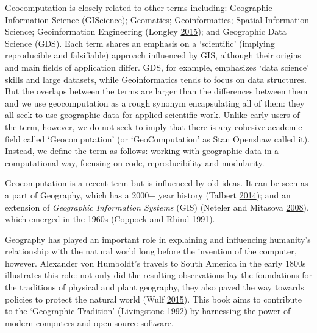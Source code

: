 \documentclass[]{krantz}
\begin{document}
Geocomputation is closely related to other terms including: Geographic Information Science (GIScience); Geomatics; Geoinformatics; Spatial Information Science; Geoinformation Engineering (Longley \protect\hyperlink{ref-longley_geographic_2015}{2015}); and Geographic Data Science (GDS).
Each term shares an emphasis on a `scientific' (implying reproducible and falsifiable) approach influenced by GIS, although their origins and main fields of application differ.
GDS, for example, emphasizes `data science' skills and large datasets, while Geoinformatics tends to focus on data structures.
But the overlaps between the terms are larger than the differences between them and we use geocomputation as a rough synonym encapsulating all of them:
they all seek to use geographic data for applied scientific work.
Unlike early users of the term, however, we do not seek to imply that there is any cohesive academic field called `Geocomputation' (or `GeoComputation' as Stan Openshaw called it).
Instead, we define the term as follows: working with geographic data in a computational way, focusing on code, reproducibility and modularity.

Geocomputation is a recent term but is influenced by old ideas.
It can be seen as a part of Geography, which has a 2000+ year history (Talbert \protect\hyperlink{ref-talbert_ancient_2014}{2014});
and an extension of \emph{Geographic Information Systems} (GIS) (Neteler and Mitasova \protect\hyperlink{ref-neteler_open_2008}{2008}), which emerged in the 1960s (Coppock and Rhind \protect\hyperlink{ref-coppock_history_1991}{1991}).

Geography has played an important role in explaining and influencing humanity's relationship with the natural world long before the invention of the computer, however.
Alexander von Humboldt's travels to South America in the early 1800s illustrates this role:
not only did the resulting observations lay the foundations for the traditions of physical and plant geography, they also paved the way towards policies to protect the natural world (Wulf \protect\hyperlink{ref-wulf_invention_2015}{2015}).
This book aims to contribute to the `Geographic Tradition' (Livingstone \protect\hyperlink{ref-livingstone_geographical_1992}{1992}) by harnessing the power of modern computers and open source software.
\end{document}
